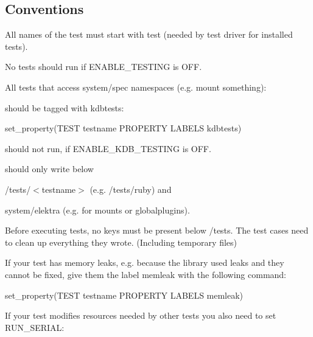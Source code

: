 \subsection*{Conventions}


\begin{DoxyItemize}
\item All names of the test must start with test (needed by test driver for installed tests).
\item No tests should run if E\+N\+A\+B\+L\+E\+\_\+\+T\+E\+S\+T\+I\+NG is O\+FF.
\item All tests that access system/spec namespaces (e.\+g. mount something)\+:
\item should be tagged with {\ttfamily kdbtests}\+:
\end{DoxyItemize}


\begin{DoxyCode}
set\_property(TEST testname PROPERTY LABELS kdbtests)
\end{DoxyCode}



\begin{DoxyItemize}
\item should not run, if {\ttfamily E\+N\+A\+B\+L\+E\+\_\+\+K\+D\+B\+\_\+\+T\+E\+S\+T\+I\+NG} is O\+FF.
\item should only write below
\begin{DoxyItemize}
\item {\ttfamily /tests/$<$testname$>$} (e.\+g. {\ttfamily /tests/ruby}) and
\item {\ttfamily system/elektra} (e.\+g. for mounts or globalplugins).
\end{DoxyItemize}
\item Before executing tests, no keys must be present below {\ttfamily /tests}. The test cases need to clean up everything they wrote. (Including temporary files)
\item If your test has memory leaks, e.\+g. because the library used leaks and they cannot be fixed, give them the label {\ttfamily memleak} with the following command\+:
\end{DoxyItemize}


\begin{DoxyCode}
set\_property(TEST testname PROPERTY LABELS memleak)
\end{DoxyCode}



\begin{DoxyItemize}
\item If your test modifies resources needed by other tests you also need to set {\ttfamily R\+U\+N\+\_\+\+S\+E\+R\+I\+AL}\+:
\end{DoxyItemize}


